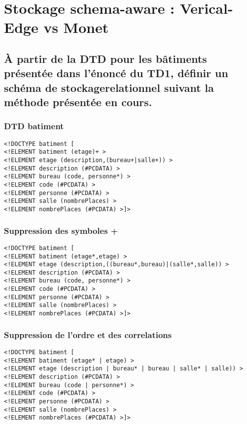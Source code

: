 \chapter{Stockage schema-aware : Verical-Edge vs Monet}
\section{À partir de la DTD pour les bâtiments présentée dans l’énoncé du TD1, définir un schéma de stockagerelationnel suivant la méthode présentée en cours.}
\subsection{DTD batiment}
\begin{verbatim}
<!DOCTYPE batiment [ 
<!ELEMENT batiment (etage)+ >
<!ELEMENT etage (description,(bureau+|salle+)) >
<!ELEMENT description (#PCDATA) >
<!ELEMENT bureau (code, personne*) >
<!ELEMENT code (#PCDATA) >
<!ELEMENT personne (#PCDATA) >
<!ELEMENT salle (nombrePlaces) >
<!ELEMENT nombrePlaces (#PCDATA) >]>
\end{verbatim}

\subsection{Suppression des symboles +}
\begin{verbatim}
<!DOCTYPE batiment [ 
<!ELEMENT batiment (etage*,etage) >
<!ELEMENT etage (description,((bureau*,bureau)|(salle*,salle)) >
<!ELEMENT description (#PCDATA) >
<!ELEMENT bureau (code, personne*) >
<!ELEMENT code (#PCDATA) >
<!ELEMENT personne (#PCDATA) >
<!ELEMENT salle (nombrePlaces) >
<!ELEMENT nombrePlaces (#PCDATA) >]>
\end{verbatim}

\subsection{Suppression de l'ordre et des correlations}
\begin{verbatim}
<!DOCTYPE batiment [ 
<!ELEMENT batiment (etage* | etage) >
<!ELEMENT etage (description | bureau* | bureau | salle* | salle)) >
<!ELEMENT description (#PCDATA) >
<!ELEMENT bureau (code | personne*) >
<!ELEMENT code (#PCDATA) >
<!ELEMENT personne (#PCDATA) >
<!ELEMENT salle (nombrePlaces) >
<!ELEMENT nombrePlaces (#PCDATA) >]>
\end{verbatim}

